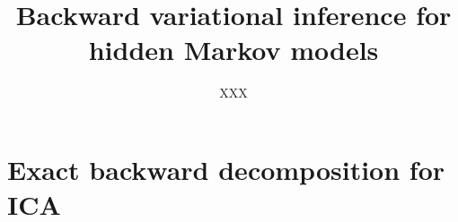 \documentclass{article}
\title{Backward variational inference for hidden Markov models}
\date{}
\author[$\dag$]{XXX}
\affil[$\dag$]{{\small }}
\newcommand{\1}{\mathbbm{1}}
\begin{document}
\maketitle

\begin{abstract}

\end{abstract}


\section{Exact backward decomposition for ICA}

\end{document}
